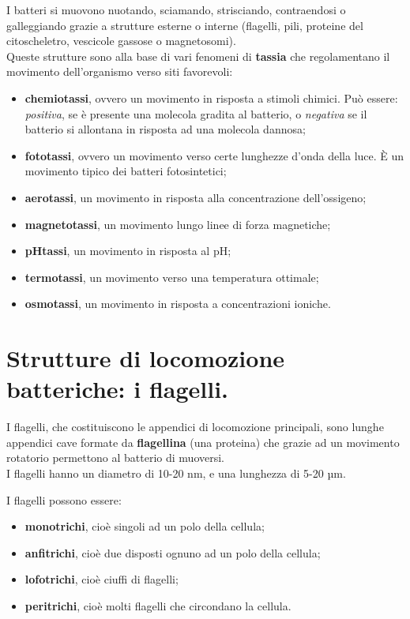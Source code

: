 \documentclass[11pt]{book}
\begin{document}
I batteri si muovono nuotando, sciamando, strisciando, contraendosi o galleggiando grazie a strutture esterne o interne (flagelli, pili, proteine del citoscheletro, vescicole gassose o magnetosomi).\\
Queste strutture sono alla base di vari fenomeni di \textbf{tassia} che regolamentano il movimento dell'organismo verso siti favorevoli:
\begin{itemize}
\item \textbf{chemiotassi}, ovvero un movimento in risposta a stimoli chimici. Può essere: \emph{positiva}, se è presente una molecola gradita al batterio, o \emph{negativa} se il batterio si allontana in risposta ad una molecola dannosa;
\item \textbf{fototassi}, ovvero un movimento verso certe lunghezze d’onda della luce. È un movimento tipico dei batteri fotosintetici;
\item \textbf{aerotassi}, un movimento in risposta alla concentrazione dell’ossigeno;
\item \textbf{magnetotassi}, un movimento lungo linee di forza magnetiche;
\item \textbf{pHtassi}, un movimento in risposta al pH;
\item \textbf{termotassi}, un movimento verso una temperatura ottimale;
\item \textbf{osmotassi}, un movimento in risposta a concentrazioni ioniche.
\end{itemize}

\section{Strutture di locomozione batteriche: i flagelli.}

I flagelli, che costituiscono le appendici di locomozione principali, sono lunghe appendici cave formate da \textbf{flagellina} (una proteina) che grazie ad un movimento rotatorio permettono al batterio di muoversi.\\
I flagelli hanno un diametro di 10-20 nm, e una lunghezza di 5-20 µm.

\vspace{1em}
I flagelli possono essere:
\begin{itemize}
\item \textbf{monotrichi}, cioè singoli ad un polo della cellula; 
\item \textbf{anfitrichi}, cioè due disposti ognuno ad un polo della cellula; 
\item \textbf{lofotrichi}, cioè ciuffi di flagelli; 
\item \textbf{peritrichi}, cioè molti flagelli che circondano la cellula.
\end{itemize}
\end{document}
